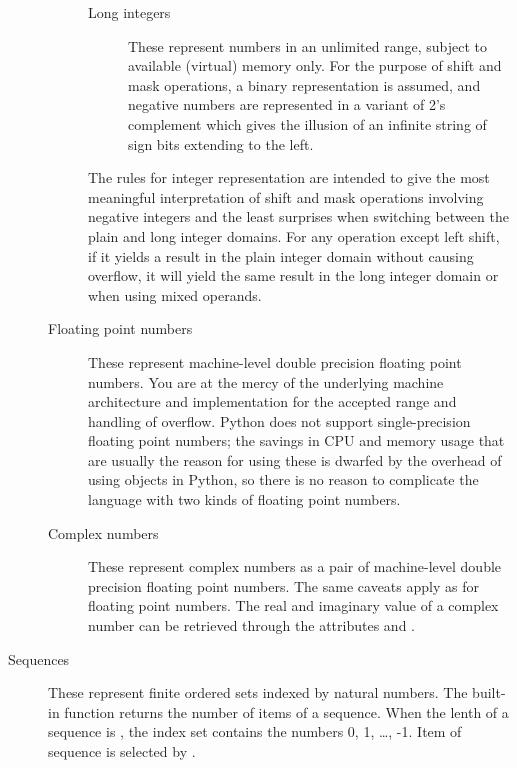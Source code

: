 \begin{description}
\begin{description}
\begin{description}
\item[Long integers]
These represent numbers in an unlimited range, subject to available
(virtual) memory only.  For the purpose of shift and mask operations,
a binary representation is assumed, and negative numbers are
represented in a variant of 2's complement which gives the illusion of
an infinite string of sign bits extending to the left.

\end{description} %

The rules for integer representation are intended to give the most
meaningful interpretation of shift and mask operations involving
negative integers and the least surprises when switching between the
plain and long integer domains.  For any operation except left shift,
if it yields a result in the plain integer domain without causing
overflow, it will yield the same result in the long integer domain or
when using mixed operands.

\item[Floating point numbers]
These represent machine-level double precision floating point numbers.  
You are at the mercy of the underlying machine architecture and
\C{} implementation for the accepted range and handling of overflow.
Python does not support single-precision floating point numbers; the
savings in CPU and memory usage that are usually the reason for using
these is dwarfed by the overhead of using objects in Python, so there
is no reason to complicate the language with two kinds of floating
point numbers.

\item[Complex numbers]
These represent complex numbers as a pair of machine-level double
precision floating point numbers.  The same caveats apply as for
floating point numbers.  The real and imaginary value of a complex
number  can be retrieved through the attributes 
and .

\end{description} %

\item[Sequences]
These represent finite ordered sets indexed by natural numbers.
The built-in function  returns the
number of items of a sequence.
When the lenth of a sequence is , the
index set contains the numbers 0, 1, \ldots, -1.  Item
 of sequence  is selected by .


\end{description}
